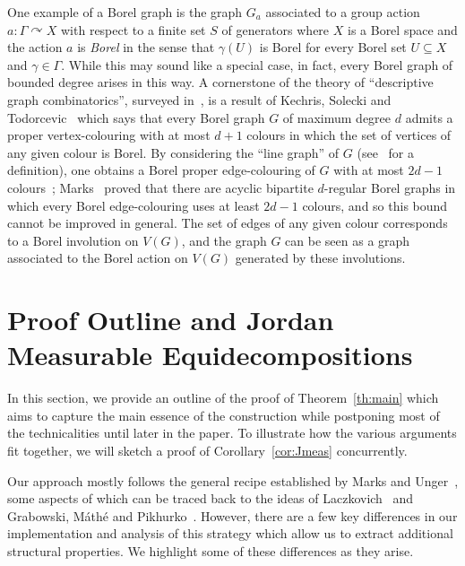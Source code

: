 \documentclass[12pt,a4paper]{amsart}
\numberwithin{equation}{section}
\newcommand{\actson}{{\curvearrowright}}
\theoremstyle{definition}
\begin{document}
One example of a Borel graph is the graph $G_a$ associated to a group action $a:\Gamma\actson X$ with respect to a finite set $S$ of generators where $X$ is a Borel space and the action $a$ is \emph{Borel} in the sense that $\gamma(U)$ is Borel for every Borel set $U\subseteq X$ and $\gamma\in \Gamma$. While this may sound like a special case, in fact, every Borel graph of bounded degree arises in this way. A cornerstone of the theory of ``descriptive graph combinatorics'', surveyed in~\cite{KechrisMarks16}, is a result of Kechris, Solecki and Todorcevic~\cite[Proposition~4.6]{KechrisSoleckiTodorcevic99} which says that every Borel graph $G$ of maximum degree $d$ admits a proper vertex-colouring with at most $d+1$ colours in which the set of vertices of any given colour is Borel. By considering the ``line graph'' of $G$ (see~\cite[p.~4]{Diestel5th} for a definition), one obtains a Borel proper edge-colouring of $G$ with at most $2d-1$ colours~\cite[p.~15]{KechrisSoleckiTodorcevic99}; Marks~\cite{Marks16} proved that there are acyclic bipartite $d$-regular Borel graphs in which every Borel edge-colouring uses at least $2d-1$ colours, and so this bound cannot be improved in general. The set of edges of any given colour corresponds to a Borel involution on $V(G)$, and the graph $G$ can be seen as a graph associated to the Borel action on $V(G)$ generated by these involutions. 

\section{Proof Outline and Jordan Measurable Equidecompositions}  
\label{sec:JSec}

In this section, we provide an outline of the proof of Theorem~\ref{th:main} which aims to capture the main essence of the construction while postponing most of the technicalities until later in the paper. To illustrate how the various arguments fit together, we will sketch a proof of Corollary~\ref{cor:Jmeas} concurrently. 

Our approach mostly follows the general recipe established by Marks and Unger~\cite{MarksUnger17}, some aspects of which can be traced back to the ideas of Laczkovich~\cite{Laczkovich90,Laczkovich92,Laczkovich92b} and Grabowski, M\'ath\'{e} and Pikhurko~\cite{GrabowskiMathePikhurko17}. However, there are a few key differences in our implementation and analysis of this strategy which allow us to extract additional structural properties. We highlight some of these differences as they arise. 
\end{document}
